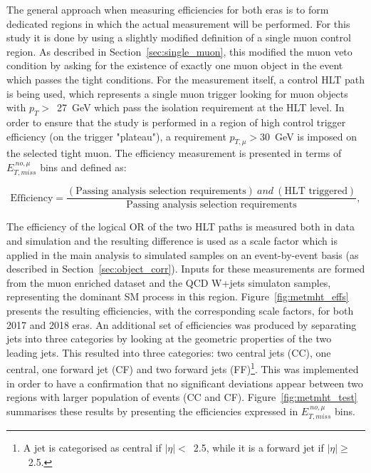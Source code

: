 \hspace{10pt} The general approach when measuring efficiencies for both eras is to form dedicated regions in which the actual measurement will be performed. For this study it is done by using a slightly modified definition of a single muon control region. As described in Section~\ref{sec:single_muon}, this modified the muon veto condition by asking for the existence of exactly one muon object in the event which passes the tight conditions. For the measurement itself, a control HLT path is being used, which represents a single muon trigger looking for muon objects with $p_T>$~27~GeV which pass the isolation requirement at the HLT level. In order to ensure that the study is performed in a region of high control trigger efficiency (on the trigger "plateau"), a requirement $p_{T,\mu}>30$~GeV is imposed on the selected tight muon. The efficiency measurement is presented in terms of $E_{T,miss}^{~no,\mu}$ bins and defined as:

\begin{equation}
\text{Efficiency} = \frac{(\text{Passing analysis selection requirements})~and~(\text{HLT triggered})}{\text{Passing analysis selection requirements}},
\end{equation}

The efficiency of the logical OR of the two HLT paths is measured both in data and simulation and the resulting difference is used as a scale factor which is applied in the main analysis to simulated samples on an event-by-event basis (as described in Section~\ref{sec:object_corr}). Inputs for these measurements are formed from the muon enriched dataset and the QCD W+jets simulaton samples, representing the dominant SM process in this region. Figure~\ref{fig:metmht_effs} presents the resulting efficiencies, with the corresponding scale factors, for both 2017 and 2018 eras. An additional set of efficiencies was produced by separating jets into three categories by looking at the geometric properties of the two leading jets. This resulted into three categories: two central jets (CC), one central, one forward jet (CF) and two forward jets (FF)\footnote{A jet is categorised as central if $|\eta|<$~2.5, while it is a forward jet if $|\eta|\geq$~2.5.}. This was implemented in order to have a confirmation that no significant deviations appear between two regions with larger population of events (CC and CF). Figure~\ref{fig:metmht_test} summarises these results by presenting the efficiencies expressed in $E_{T,miss}^{~no,\mu}$ bins.

